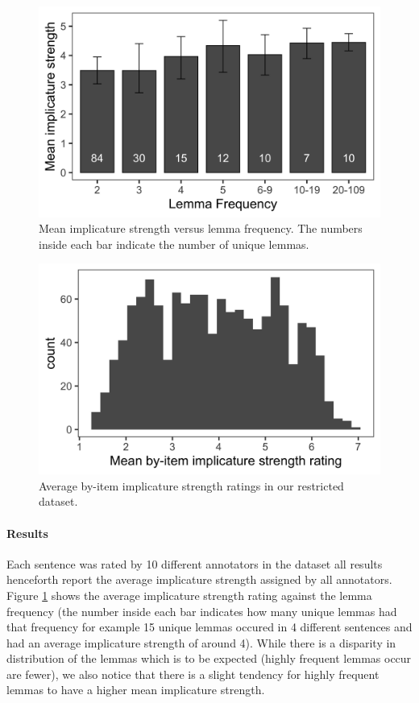 \documentclass[10pt, biblatex, linguex]{report}
\begin{document}
\begin{figure}[t]
    \centering
    \includegraphics[width=\linewidth]{images/lemma.png}
    \caption{Mean implicature strength versus lemma frequency. The numbers inside
             each bar indicate the number of unique lemmas.}
    \label{fig:lemma}
\end{figure}

\begin{figure}[t]
    \centering
    \includegraphics[width=\linewidth]{images/dist.png}
    \caption{Average by-item implicature strength ratings in our restricted dataset.}
    \label{fig:dist}
\end{figure}


\paragraph{Results} Each sentence was rated by 10 different annotators in the
dataset \dash all results henceforth report the average implicature strength
assigned by all annotators. Figure \ref{fig:lemma} shows the average implicature
strength rating against the lemma frequency (the number inside each bar indicates
how many unique lemmas had that frequency \dash for example 15 unique lemmas
occured in 4 different sentences and had an average implicature strength of
around 4). While there is a disparity in distribution of the lemmas which is to be
expected (highly frequent lemmas occur are fewer), we also notice that there is
a slight tendency for highly frequent lemmas to have a higher mean
implicature strength.
\end{document}
